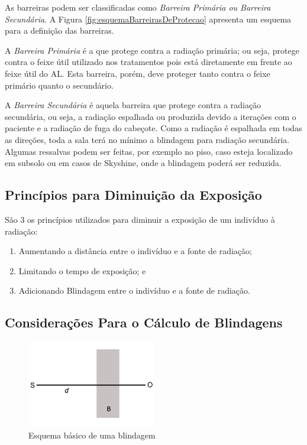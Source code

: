 \documentclass[11pt,a4paper]{article}
\begin{document}
            As barreiras podem ser classificadas como \textit{Barreira Primária ou Barreira Secundária}. A Figura \ref{fig:esquemaBarreirasDeProtecao} apresenta um esquema para a definição das barreiras.

            A \textit{\textcolor{CarnationPink}{Barreira Primária}} é a que protege contra a radiação primária; ou seja, protege contra o feixe útil utilizado nos tratamentos pois está diretamente em frente ao feixe útil do AL. Esta barreira, porém, deve proteger tanto contra o feixe primário quanto o secundário.

            A {\textit{\textcolor{CarnationPink}{Barreira Secundária}}} é aquela barreira que protege contra a radiação secundária, ou seja, a radiação espalhada ou produzida devido a iterações com o paciente e a radiação de fuga do cabeçote. Como a radiação é espalhada em todas as direções, toda a sala terá no mínimo a blindagem para radiação secundária. Algumas ressalvas podem ser feitas, por exemplo no piso, caso esteja localizado em subsolo ou em casos de Skyshine, onde a blindagem poderá ser reduzida.
        
        
        \subsection{Princípios para Diminuição da Exposição}
            
            São 3 os princípios utilizados para diminuir a exposição de um indivíduo à radiação:

            \begin{enumerate}
                \item Aumentando a distância entre o indivíduo e a fonte de radiação;
                \item Limitando o tempo de exposição; e
                \item Adicionando Blindagem entre o indivíduo e a fonte de radiação.
            \end{enumerate}
        
        \subsection{Considerações Para o Cálculo de Blindagens}

        \begin{figure}
            \centering
            \includegraphics[width=0.5\textwidth]{Imagens/esquemaBasicoDeBlindagem.jpg}
            \caption{Esquema básico de uma blindagem}
            \label{fig:esquemaBasicoDeBlindagem}
        \end{figure}
\end{document}
